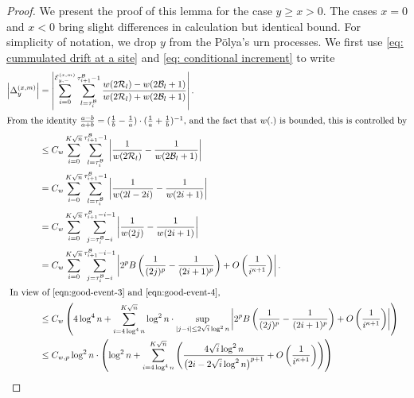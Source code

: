 \documentclass[twoside,12pt, a4paper]{article}
\numberwithin{equation}{section}
\theoremstyle{remark}
\newcommand{\edt}[1]{\textcolor{red}{#1}} %
\begin{document}
	\begin{proof}%
		We present the proof of this lemma for the case $y \ge  x > 0$. The cases $x = 0$ and $x<0$ bring slight differences in calculation but identical bound. For simplicity of notation, we drop $y$ from the P\"olya's urn processes. We first use \eqref{eq: cummulated drift at a site} and \eqref{eq: conditional increment} to write 
		\begin{align*}
			\left| \Delta_y^{(x,m)} \right| 
			&= 
			\left| 	\sum_{i = 0}^{\mathcal{E}_{y,-}^{(x,m)}} 
			\sum_{l = \tau_i^{\mathcal{B}}} ^{\tau_{i+1}^{\mathcal{B}}  -1}
			\frac{w(2 \mathcal{R}_l)- w(2 \mathcal{B}_l + 1)}{w(2 \mathcal{R}_l)+ w(2 \mathcal{B}_l + 1)}
			\right| .\\
			\intertext{From the identity $\frac{a - b}{a + b} = (\frac{1}{b} - \frac{1}{a})\cdot(\frac{1}{a} + \frac{1}{b})^{-1}$, and the fact that $w(.)$ is bounded, this is controlled by}
			&\le C_w \sum_{i = 0}^{K \sqrt{n} } \sum_{l = \tau_i^{\mathcal{B}}} ^{\tau_{i+1}^{\mathcal{B}}  -1}
			\left| \frac{1}{w(2 \mathcal{R}_l)} - \frac{1}{w(2 \mathcal{B}_l + 1)} \right|  \\
			&= C_w \sum_{i = 0}^{K \sqrt{n} } \sum_{l = \tau_i^{\mathcal{B}}} ^{\tau_{i+1}^{\mathcal{B}}  -1}
			\left| \frac{1}{w(2 l - 2 i)} - \frac{1}{w(2i + 1)} \right|  \\
			&= C_w \sum_{i = 0}^{K \sqrt{n} }
			\sum_{j = \tau_i^{\mathcal{B}} - i}^{\tau_{i+1}^{\mathcal{B}} - i - 1} \left| \frac{1}{w(2j)} - \frac{1}{w(2i + 1)} \right|  \\
			&= C_w \sum_{i = 0}^{K \sqrt{n} }
			\sum_{j = \tau_i^{\mathcal{B}} - i}^{\tau_{i+1}^{\mathcal{B}} - i - 1} \left|  2^p B\left( \frac{1}{(2j)^p} - \frac{1}{(2i + 1)^p} \right)  + O\left( \frac{1}{i^{\kappa + 1}} \right) \right|  .\\
			\intertext{
				In view of \eqref{eqn:good-event-3} and \eqref{eqn:good-event-4},
			}
			&\le C_w \left(4 \log^4 n + \sum_{i = 4 \log^4 n}^{K \sqrt{n} } \log^2 n \cdot \sup_{|j - i| \le 2 \sqrt{i}  \log^2 n} \left|  2^p B\left( \frac{1}{(2j)^p} - \frac{1}{(2i + 1)^p} \right)  + O\left( \frac{1}{i^{\kappa + 1}} \right) \right|\right)\\
			&\le C_{w, p} \log^2 n \cdot \left( \log^2 n + \sum_{i = 4 \log^4 n}^{K \sqrt{n} } \left( 
			\frac{4 \sqrt{ i } \log^2 n }{\left(2 i - 2 \sqrt{ i } \log^2 n\right)^{p + 1}} 
			+ O\left( \frac{1}{i^{\kappa + 1}} \right)
			\right) \right)  \\

\end{align*}
\end{proof}
\end{document}

